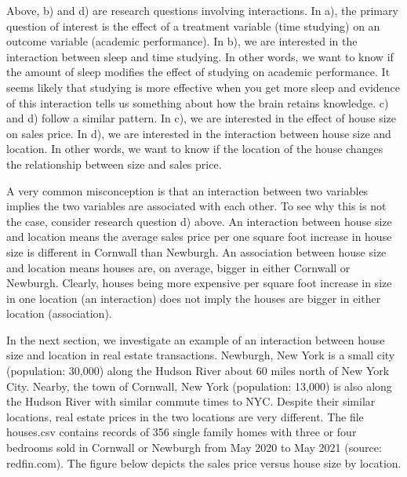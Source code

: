 \documentclass[]{book}
\begin{document}
Above, b) and d) are research questions involving interactions. In a), the primary question of interest is the effect of a treatment variable (time studying) on an outcome variable (academic performance). In b), we are interested in the interaction between sleep and time studying. In other words, we want to know if the amount of sleep modifies the effect of studying on academic performance. It seems likely that studying is more effective when you get more sleep and evidence of this interaction tells us something about how the brain retains knowledge. c) and d) follow a similar pattern. In c), we are interested in the effect of house size on sales price. In d), we are interested in the interaction between house size and location. In other words, we want to know if the location of the house changes the relationship between size and sales price.

A very common misconception is that an interaction between two variables implies the two variables are associated with each other. To see why this is not the case, consider research question d) above. An interaction between house size and location means the average sales price per one square foot increase in house size is different in Cornwall than Newburgh. An association between house size and location means houses are, on average, bigger in either Cornwall or Newburgh. Clearly, houses being more expensive per square foot increase in size in one location (an interaction) does not imply the houses are bigger in either location (association).

In the next section, we investigate an example of an interaction between house size and location in real estate transactions. Newburgh, New York is a small city (population: 30,000) along the Hudson River about 60 miles north of New York City. Nearby, the town of Cornwall, New York (population: 13,000) is also along the Hudson River with similar commute times to NYC. Despite their similar locations, real estate prices in the two locations are very different. The file houses.csv contains records of 356 single family homes with three or four bedrooms sold in Cornwall or Newburgh from May 2020 to May 2021 (source: redfin.com). The figure below depicts the sales price versus house size by location.
\end{document}
